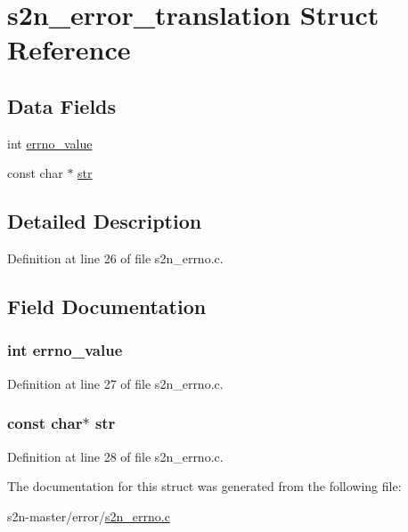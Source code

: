 \hypertarget{structs2n__error__translation}{}\section{s2n\+\_\+error\+\_\+translation Struct Reference}
\label{structs2n__error__translation}
\subsection*{Data Fields}
\begin{DoxyCompactItemize}
\item 
int \hyperlink{structs2n__error__translation_a3df3ac3194b143a185873c438bae4965}{errno\+\_\+value}
\item 
const char $\ast$ \hyperlink{structs2n__error__translation_af25d6dc49269fa2003ac7c7fa6f13915}{str}
\end{DoxyCompactItemize}


\subsection{Detailed Description}


Definition at line 26 of file s2n\+\_\+errno.\+c.



\subsection{Field Documentation}
\subsubsection[{\texorpdfstring{errno\+\_\+value}{errno_value}}]{\setlength{\rightskip}{0pt plus 5cm}int errno\+\_\+value}\hypertarget{structs2n__error__translation_a3df3ac3194b143a185873c438bae4965}{}\label{structs2n__error__translation_a3df3ac3194b143a185873c438bae4965}


Definition at line 27 of file s2n\+\_\+errno.\+c.

\subsubsection[{\texorpdfstring{str}{str}}]{\setlength{\rightskip}{0pt plus 5cm}const char$\ast$ str}\hypertarget{structs2n__error__translation_af25d6dc49269fa2003ac7c7fa6f13915}{}\label{structs2n__error__translation_af25d6dc49269fa2003ac7c7fa6f13915}


Definition at line 28 of file s2n\+\_\+errno.\+c.



The documentation for this struct was generated from the following file\+:\begin{DoxyCompactItemize}
\item 
s2n-\/master/error/\hyperlink{s2n__errno_8c}{s2n\+\_\+errno.\+c}\end{DoxyCompactItemize}
